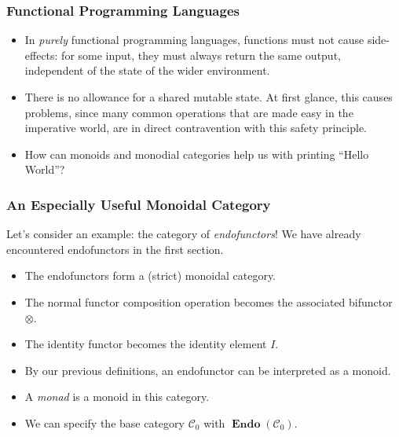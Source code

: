 \documentclass{beamer}
\numberwithin{figure}{section}
\DeclareMathOperator{\catendo}{\mathbf{Endo}}
\begin{document}
\begin{frame}
        \frametitle{Functional Programming Languages}
        \begin{itemize}[<+->]
                \item In \textit{purely} functional programming languages,
                        functions must not cause side-effects: for some input,
                        they must always return the same output, independent of
                        the state of the wider environment.
                \item There is no allowance for a shared mutable state. At first
                        glance, this causes problems, since many common
                        operations that are made easy in the imperative world,
                        are in direct contravention with this safety principle.
                \item How can monoids and monodial categories help us with
                        printing ``Hello World''?
        \end{itemize}
\end{frame}

\begin{frame}
        \frametitle{An Especially Useful Monoidal Category}
        Let's consider an example: the category of \textit{endofunctors}! We
        have already encountered endofunctors in the first section.
        \begin{itemize}[<+->]
                \item The endofunctors form a (strict) monoidal category.
                \item The normal functor composition operation becomes the
                        associated bifunctor $\otimes$.
                \item The identity functor becomes the identity element $I$.
                \item By our previous definitions, an endofunctor can be
                        interpreted as a monoid.
                \item A \textit{monad} is a monoid in this category.
                \item We can specify the base category $\mathcal{C}_0$ with
                        $\catendo{(\mathcal{C}_0)}$.
        \end{itemize}
\end{frame}
\end{document}
